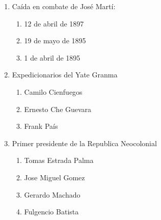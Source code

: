\documentclass[twocolumn]{article}
\begin{document}
\begin{enumerate}



  \item Caída en combate de José Martí:

  \begin{enumerate}
   
   \item 12 de abril de 1897
   
   \item 19 de mayo de 1895
   
   \item 1 de abril de 1895
   
  \end{enumerate}



  \item Expedicionarios del Yate Granma

  \begin{enumerate}
   
   \item Camilo Cienfuegos
   
   \item Ernesto Che Guevara
   
   \item Frank País
   
  \end{enumerate}



  \item Primer presidente de la Republica Neocolonial

  \begin{enumerate}
   
   \item Tomas Estrada Palma
   
   \item Jose Miguel Gomez
   
   \item Gerardo Machado
   
   \item Fulgencio Batista
   

\end{enumerate}
\end{enumerate}
\end{document}
